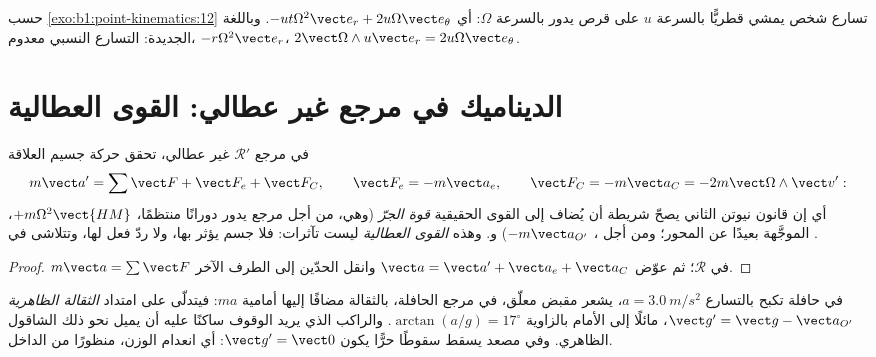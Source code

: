 \begin{example}\label{ex:b1:non-inertial-frames:turntable}
حسب \cref{exo:b1:point-kinematics:12} تسارع شخص
يمشي قطريًّا بالسرعة $u$ على قرص يدور بالسرعة $\Omega$: أي $-ut\Omega^2\vect e_r
+ 2u\Omega\vect e_\theta$. وباللغة الجديدة: التسارع النسبي معدوم،
 $-r\Omega^2\vect e_r$،  $2\vect\Omega\wedge u\vect e_r = 2u\Omega\vect e_\theta$.
\end{example}

\section{الديناميك في مرجع غير عطالي: القوى العطالية}

\begin{theorem}\label{thm:b1:non-inertial-frames:dynamics}
في مرجع $\mathcal R'$ غير عطالي، تحقق حركة جسيم
العلاقة
\[
m\vect a' = \sum\vect F + \vect F_e + \vect F_C, \qquad
\vect F_e = -m\vect a_e, \qquad \vect F_C = -m\vect a_C = -2m\vect\Omega\wedge\vect v' :
\]
أي إن قانون نيوتن الثاني يصحّ شريطة أن يُضاف إلى القوى الحقيقية
\emph{قوة الجرّ} (وهي، من أجل مرجع يدور دورانًا منتظمًا،
\emph{} $+m\Omega^2\vect{HM}$، الموجَّهة بعيدًا عن
المحور؛ ومن أجل ، $-m\vect a_{O'}$) و\emph{}. وهذه \emph{القوى العطالية} ليست تآثرات: فلا جسم
يؤثر بها، ولا ردّ فعل لها، وتتلاشى في .
\end{theorem}

\begin{proof}
$m\vect a = \sum\vect F$ في  $\mathcal R$؛ ثم عوّض
$\vect a = \vect a' + \vect a_e + \vect a_C$ وانقل الحدّين إلى الطرف
الآخر.
\end{proof}

\begin{example}\label{ex:b1:non-inertial-frames:bus}
في حافلة تكبح بالتسارع $a = \qty{3.0}{m/s^2}$، يشعر مقبض معلّق، في
مرجع الحافلة، بالثقالة مضافًا إليها  أمامية $ma$: فيتدلّى
على امتداد \emph{الثقالة الظاهرية} $\vect g' = \vect g - \vect a_{O'}$، مائلًا
إلى الأمام بالزاوية $\arctan(a/g) = 17^\circ$. والراكب الذي يريد الوقوف
ساكنًا عليه أن يميل نحو ذلك الشاقول الظاهري. وفي مصعد يسقط
سقوطًا حرًّا يكون $\vect g' = \vect 0$: أي انعدام الوزن، منظورًا من الداخل.
\end{example}

